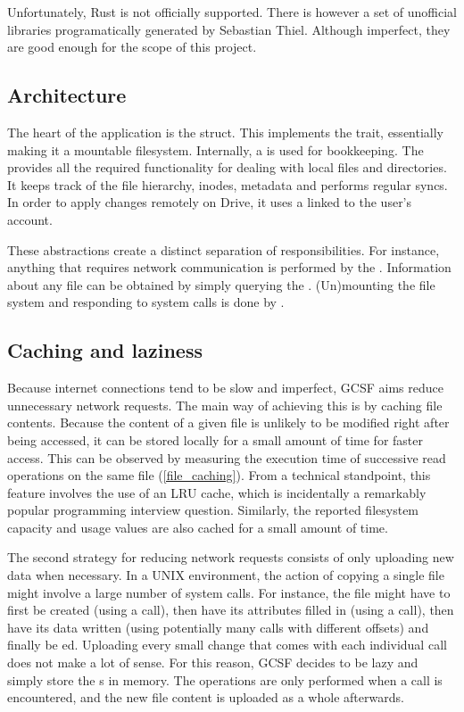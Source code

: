 Unfortunately, Rust is not officially supported. There is however a set of unofficial libraries\cite{google_apis_rs}  programatically generated by Sebastian Thiel\cite{sebastian_thiel}. Although imperfect, they are good enough for the scope of this project.

\subsection{Architecture}

The heart of the application is the  struct. This implements the  trait, essentially making it a mountable filesystem. Internally, a  is used for bookkeeping. The  provides all the required functionality for dealing with local files and directories. It keeps track of the file hierarchy, inodes, metadata and performs regular syncs. In order to apply changes remotely on Drive, it uses a  linked to the user's account.

These abstractions create a distinct separation of responsibilities. For instance, anything that requires network communication is performed by the . Information about any file can be obtained by simply querying the . (Un)mounting the file system and responding to system calls is done by .

\subsection{Caching and laziness}

Because internet connections tend to be slow and imperfect, GCSF aims reduce unnecessary network requests. The main way of achieving this is by caching file contents. Because the content of a given file is unlikely to be modified right after being accessed, it can be stored locally for a small amount of time for faster access. This can be observed by measuring the execution time of successive read operations on the same file (\ref{file_caching}). From a technical standpoint, this feature involves the use of an LRU cache, which is incidentally a remarkably popular programming interview question. Similarly, the reported filesystem capacity and usage values are also cached for a small amount of time.

The second strategy for reducing network requests consists of only uploading new data when necessary. In a UNIX environment, the action of copying a single file might involve a large number of system calls. For instance, the file might have to first be created (using a  call), then have its attributes filled in (using a  call), then have its data written (using potentially many  calls with different offsets) and finally be ed. Uploading every small change that comes with each individual  call does not make a lot of sense. For this reason, GCSF decides to be lazy and simply store the s in memory. The operations are only performed when a  call is encountered, and the new file content is uploaded as a whole afterwards.


